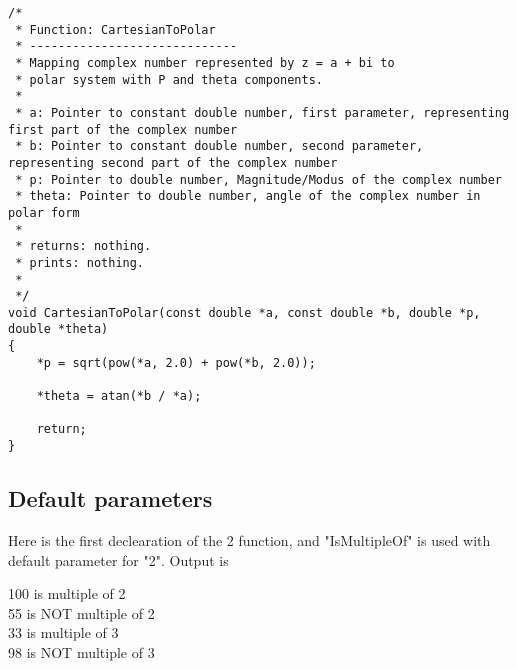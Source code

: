 \documentclass{article}
\begin{document}
		\begin{lstlisting}[label=multiple-returned-values,caption=Multiple Return Values]	
/*
 * Function: CartesianToPolar
 * -----------------------------
 * Mapping complex number represented by z = a + bi to 
 * polar system with P and theta components.
 *
 * a: Pointer to constant double number, first parameter, representing first part of the complex number
 * b: Pointer to constant double number, second parameter, representing second part of the complex number
 * p: Pointer to double number, Magnitude/Modus of the complex number
 * theta: Pointer to double number, angle of the complex number in polar form
 *
 * returns: nothing.
 * prints: nothing.
 *
 */
void CartesianToPolar(const double *a, const double *b, double *p, double *theta)
{
    *p = sqrt(pow(*a, 2.0) + pow(*b, 2.0));
    
    *theta = atan(*b / *a);
    
    return;
}
		\end{lstlisting}
	

	\subsection{Default parameters}		
	Here is the first declearation of the 2 function, and "IsMultipleOf" is used with default parameter for "2". Output is\\
	

\begin{center}
	100 is multiple of 2 \\
	55 is NOT multiple of 2 \\
	33 is multiple of 3 \\
	98 is NOT multiple of 3 \\
\end{center}
	
\end{document}
